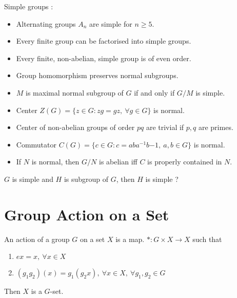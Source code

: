 \begin{remark} Simple groups :
	\begin{itemize}
		\item Alternating groups $A_n$ are simple for $n \ge 5$.%
		\item Every finite group can be factorised into simple groups.%
		\item Every finite, non-abelian, simple group is of even order.%
		\item Group homomorphism preserves normal subgroups.%
		\item $M$ is maximal normal subgroup of $G$ if and only if $G/M$ is simple.%
		\item Center $Z(G) = \{ z \in G : zg = gz,\ \forall g \in G \}$ is normal.%
		\item Center of non-abelian groups of order $pq$ are trivial if $p,q$ are primes.%
		\item Commutator $C(G) = \{ c \in G : c = aba^{-1}b{-1},\ a,b \in G \}$ is normal.%
		\item If $N$ is normal, then $G/N$ is abelian iff $C$ is properly contained in $N$.%
	\end{itemize}
\end{remark}

\begin{question}
	$G$ is simple and $H$ is subgroup of $G$, then $H$ is simple ?
\end{question}


\section{Group Action on a Set}
\begin{definition}%
	An action of a group $G$ on a set $X$ is a map.
	$\ast : G \times X \to X$ such that
	\begin{enumerate}
		\item $ex = x,\ \forall x \in X$
		\item $(g_1g_2)(x) = g_1(g_2x),\ \forall x \in X,\ \forall g_1,g_2 \in G$
	\end{enumerate}
	Then $X$ is a $G$-set.
\end{definition}

